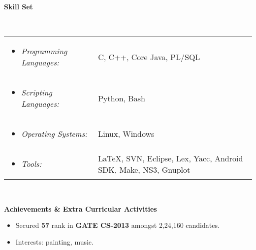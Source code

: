 \documentclass[a4paper,11pt]{article}
\newcommand{\resheading}[1]{{\small \colorbox{mygrey}{\begin{minipage}{0.975\textwidth}{\textbf{#1 \vphantom{p\^{E}}}}\end{minipage}}}}
\begin{document}


\resheading{\textbf{\large Skill Set}}\\

\begin{tabular}{ll}
	
	\begin{minipage}{2in}
		\begin{itemize}
			\item \textit{Programming Languages:}
		\end{itemize}
	\end{minipage}  & C, C++, Core Java, PL/SQL \\
	
	\begin{minipage}{2in}
		
		\begin{itemize}
			\item \textit{Scripting Languages:}
		\end{itemize}
	\end{minipage}  & Python, Bash\\
	
	\begin{minipage}{2in}
		
		\begin{itemize}
			\item \textit{Operating Systems:}
		\end{itemize}
	\end{minipage}  & Linux, Windows \\
	
	
	\begin{minipage}{2in}
		\begin{itemize}
			\item \textit{Tools:}
		\end{itemize}  
	\end{minipage}  & \LaTeX, SVN, Eclipse, Lex, Yacc, Android SDK, Make, NS3, Gnuplot \\
	
\end{tabular}
\\[0.3cm]


\resheading{\textbf{\large Achievements \& Extra Curricular Activities }}

\begin{description}
\item
\begin{itemize}
\item Secured \textbf{57} rank in \textbf{GATE CS-2013} amongst 2,24,160 candidates.
\item Interests: painting, music.
\end{itemize}
\end{description}
\end{document}
